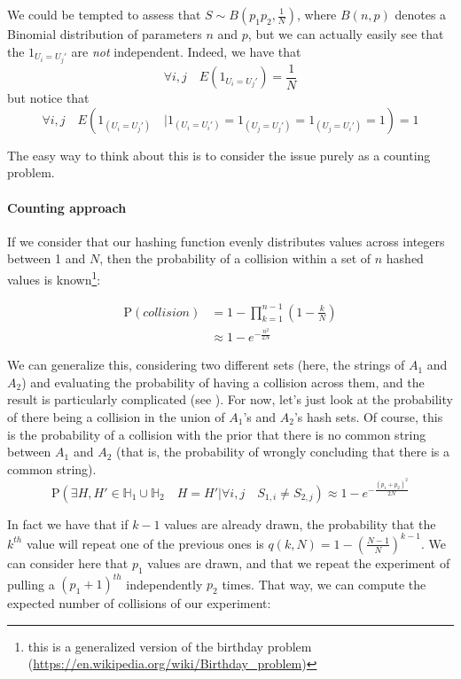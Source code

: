 \documentclass[usletter,11pt,final]{article}
\begin{document}
We could be tempted to assess that $S \sim B(p_1 p_2, \frac{1}{N})$, where $B(n,p)$ denotes a Binomial distribution of parameters $n$ and $p$, but we can actually easily see that the $1_{U_i = U_j'}$ are \textit{not} independent. Indeed, we have that $$ \forall i,j \quad E(1_{U_i = U_j'})=\frac{1}{N} $$ but notice that $$ \forall i,j \quad E(1_{(U_i = U_j')} \quad | 1_{(U_i = U_i')}=1_{(U_j = U_j')}=1_{(U_j = U_i')}=1) = 1$$

The easy way to think about this is to consider the issue purely as a counting problem.

\paragraph{Counting approach}
If we consider that our hashing function evenly distributes values across integers between 1 and $N$, then the probability of a collision within a set of $n$ hashed values is known\footnote{this is a generalized version of the birthday problem (\url{https://en.wikipedia.org/wiki/Birthday_problem})}: 

\begin{equation}
\begin{aligned}
\textrm{P}(collision) & = 1 - \prod_{k=1}^{n-1} (1 - \frac{k}{N}) \\
					  & \approx 1 - e^{- \frac{n^2}{2N}}
\end{aligned}
\end{equation}

We can generalize this, considering two different sets (here, the strings of $A_1$ and $A_2$) and evaluating the probability of having a collision across them, and the result is particularly complicated (see \cite{WENDL2003249}). For now, let's just look at the probability of there being a collision in the union of $A_1$'s and $A_2$'s hash sets. Of course, this is the probability of a collision with the prior that there is no common string between $A_1$ and $A_2$ (that is, the probability of wrongly concluding that there is a common string). $$\textrm{P}(\exists H,H' \in \mathbb{H}_1 \cup \mathbb{H}_2 \quad H=H'  | \forall i,j \quad S_{1,i} \ne S_{2,j}) \approx 1 - e^{- \frac{(p_1+p_2)^2}{2N}}$$

In fact we have that if $k-1$ values are already drawn, the probability that the $k^{th}$ value will repeat one of the previous ones is $q(k,N) = 1 - (\frac{N-1}{N})^{k-1}$. We can consider here that $p_1$ values are drawn, and that we repeat the experiment of pulling a $(p_1+1)^{th}$ independently $p_2$ times. That way, we can compute the expected number of collisions of our experiment:
\end{document}

